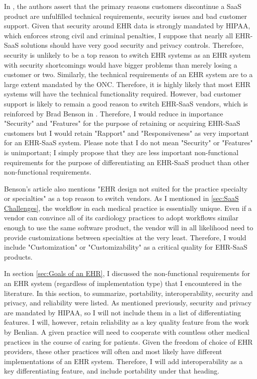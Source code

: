 \documentclass[10pt]{article}
\begin{document}
In \cite{saasqual}, the authors assert that the primary reasons customers discontinue a SaaS product are unfulfilled technical requirements, security issues and bad customer support.
Given that security around EHR data is strongly mandated by HIPAA, which enforces strong civil and criminal penalties, I suppose that nearly all EHR-SaaS solutions should have very good security and privacy controls.
Therefore, security is unlikely to be a top reason to switch EHR systems as an EHR system with security shortcomings would have bigger problems than merely losing a customer or two.
Similarly, the technical requirements of an EHR system are to a large extent mandated by the ONC.
Therefore, it is highly likely that most EHR systems will have the technical functionality required.
However, bad customer support is likely to remain a good reason to switch EHR-SaaS vendors, which is reinforced by Brad Benson in \cite{switch-ehr}.
Therefore, I would reduce in importance "Security" and "Features" for the purpose of retaining or acquiring EHR-SaaS customers but I would retain "Rapport" and "Responsiveness" as very important for an EHR-SaaS system.
Please note that I do not mean "Security" or "Features" is unimportant; 
I simply propose that they are less important non-functional requirements for the purpose of differentiating an EHR-SaaS product than other non-functional requirements.

Benson's article also mentions "EHR design not suited for the practice specialty or specialties" as a top reason to switch vendors.
As I mentioned in \ref{sec:SaaS Challenges}, the workflow in each medical practice is essentially unique.
Even if a vendor can convince all of its cardiology practices to adopt workflows similar enough to use the same software product, the vendor will in all likelihood need to provide customizations between specialties at the very least.
Therefore, I would include "Customization" or "Customizability" as a critical quality for EHR-SaaS products.

In section \ref{sec:Goals of an EHR}, I discussed the non-functional requirements for an EHR system (regardless of implementation type) that I encountered in the literature.
In this section, to summarize, portability, interoperability, security and privacy, and reliability were listed.
As mentioned previously, security and privacy are mandated by HIPAA, so I will not include them in a list of differentiating features.
I will, however, retain reliability as a key quality feature from the work by Benlian.
A given practice will need to cooperate with countless other medical practices in the course of caring for patients.
Given the freedom of choice of EHR providers, these other practices will often and most likely have different implementations of an EHR system.
Therefore, I will add interoperability as a key differentiating feature, and include portability under that heading.
\end{document}
